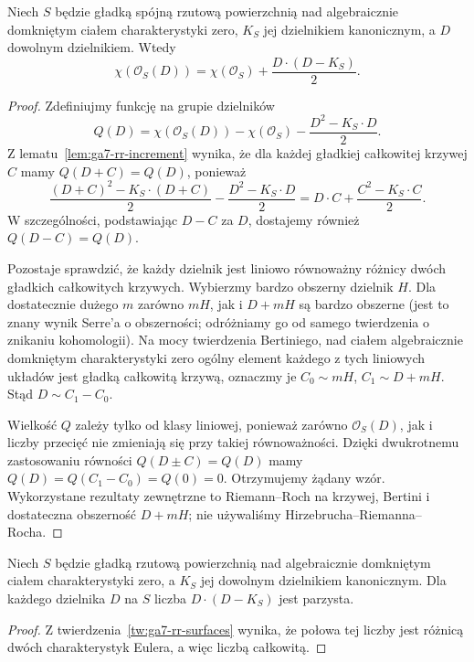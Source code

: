\begin{twierdzenie}
\label{tw:ga7-rr-surfaces}
Niech $S$ będzie gładką spójną rzutową powierzchnią
nad algebraicznie domkniętym ciałem charakterystyki zero,
$K_S$ jej dzielnikiem kanonicznym, a $D$ dowolnym dzielnikiem.
Wtedy
\[
\chi(\mathcal O_S(D))=\chi(\mathcal O_S)
+\frac{D\cdot(D-K_S)}{2}.
\]
\end{twierdzenie}
\begin{proof}
Zdefiniujmy funkcję na grupie dzielników
\[
Q(D)=\chi(\mathcal O_S(D))-\chi(\mathcal O_S)
-\frac{D^2-K_S\cdot D}{2}.
\]
Z lematu~\ref{lem:ga7-rr-increment} wynika, że
dla każdej gładkiej całkowitej krzywej $C$ mamy
$Q(D+C)=Q(D)$, ponieważ
\[
\frac{(D+C)^2-K_S\cdot(D+C)}{2}
-\frac{D^2-K_S\cdot D}{2}
=D\cdot C+\frac{C^2-K_S\cdot C}{2}.
\]
W szczególności, podstawiając $D-C$ za $D$,
dostajemy również $Q(D-C)=Q(D)$.

Pozostaje sprawdzić, że każdy dzielnik jest liniowo
równoważny różnicy dwóch gładkich całkowitych krzywych.
Wybierzmy bardzo obszerny dzielnik $H$.
Dla dostatecznie dużego $m$ zarówno $mH$,
jak i $D+mH$ są bardzo obszerne (jest to znany
wynik Serre'a o obszerności; odróżniamy go od
samego twierdzenia o znikaniu kohomologii).
Na mocy twierdzenia Bertiniego, nad ciałem
algebraicznie domkniętym charakterystyki zero
ogólny element każdego z tych liniowych układów
jest gładką całkowitą krzywą, oznaczmy je
$C_0\sim mH$, $C_1\sim D+mH$.
Stąd $D\sim C_1-C_0$.

Wielkość $Q$ zależy tylko od klasy liniowej,
ponieważ zarówno $\mathcal O_S(D)$, jak i liczby
przecięć nie zmieniają się przy takiej równoważności.
Dzięki dwukrotnemu zastosowaniu równości
$Q(D\pm C)=Q(D)$ mamy
$Q(D)=Q(C_1-C_0)=Q(0)=0$.
Otrzymujemy żądany wzór. Wykorzystane rezultaty
zewnętrzne to Riemann--Roch na krzywej,
Bertini i dostateczna obszerność $D+mH$;
nie używaliśmy Hirzebrucha--Riemanna--Rocha.
\end{proof}

\begin{wniosek}
\label{wn:ga7-parity}
Niech $S$ będzie gładką rzutową powierzchnią
nad algebraicznie domkniętym ciałem charakterystyki zero,
a $K_S$ jej dowolnym dzielnikiem kanonicznym.
Dla każdego dzielnika $D$ na $S$ liczba
$D\cdot(D-K_S)$ jest parzysta.
\end{wniosek}
\begin{proof}
Z twierdzenia~\ref{tw:ga7-rr-surfaces} wynika,
że połowa tej liczby jest różnicą dwóch
charakterystyk Eulera, a więc liczbą całkowitą.
\end{proof}

